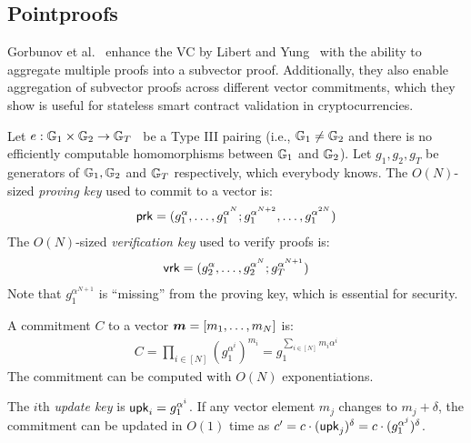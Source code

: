 \subsection{Pointproofs}
\label{s:pointproofs}

Gorbunov et al.~\cite{GRWZ20} enhance the VC by Libert and Yung~\cite{LY10} with the ability to aggregate multiple proofs into a subvector proof.
Additionally, they also enable aggregation of subvector proofs across different vector commitments, which they show is useful for stateless smart contract validation in cryptocurrencies.

Let $e : \mathbb{G}_1 \times \mathbb{G}_2\rightarrow \mathbb{G}_T$~\cite{GPS08} be a Type III pairing (i.e., $\mathbb{G}_1\ne \mathbb{G}_2$ and there is no efficiently computable homomorphisms between $\mathbb{G}_1$ and $\mathbb{G}_2$).
Let $g_1,g_2,g_T$ be generators of $\mathbb{G}_1, \mathbb{G}_2$ and $\mathbb{G}_T$ respectively, which everybody knows.
The $O(N)$-sized \textit{proving key} used to commit to a vector is:
\begin{align}
    \mathsf{prk} = (g_1^{\alpha},\dots, g_1^{\alpha^N}; g_1^{\alpha^{N+2}},\dots, g_1^{\alpha^{2N}})
\end{align}
The $O(N)$-sized \textit{verification key} used to verify proofs is:
\begin{align}
    \mathsf{vrk} = (g_2^{\alpha},\dots,g_2^{\alpha^N}; g_T^{\alpha^{N+1}})
\end{align}
Note that $g_1^{\alpha^{N+1}}$ is ``missing'' from the proving key, which is essential for security.

A commitment $C$ to a vector $\bm{m}=[m_1,\dots,m_N]$ is:
\begin{align}
    C = \prod_{i\in[N]} \left(g_1^{\alpha^i}\right)^{m_i}
      = g_1^{\sum_{i\in [N]} m_i\alpha^i}
\end{align}
The commitment can be computed with $O(N)$ exponentiations.

The $i$th \textit{update key} is $\mathsf{upk}_i=g_1^{\alpha^i}$.
If any vector element $m_j$ changes to $m_j + \delta$, the commitment can be updated in $O(1)$ time as $c' = c \cdot (\mathsf{upk}_j)^{\delta} = c\cdot (g_1^{\alpha^j})^{\delta}$.

